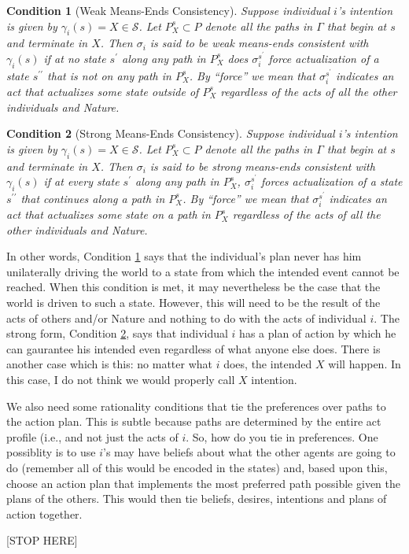 \documentclass[
11pt,
titlepage,
reqno,
]{article}%
\newtheorem{condition}{Condition}
\theoremstyle{definition}
\begin{document}
	\begin{condition}[Weak Means-Ends Consistency]\label{cond:weak M-E}
		Suppose individual $i$'s intention is given by $\gamma_i(s)=X\in\mathcal{S}$. 
		Let $P^s_X\subset P$ denote all the paths in $\Gamma$ that begin at $s$ and terminate in $X$. 
		Then $\sigma_i$ is said to be \textit{weak means-ends consistent with $\gamma_i(s)$} if at no state $s^\prime$ along any path in $P^s_X$ does $\sigma_i^{s^\prime}$ force actualization of a state $s^{\prime\prime}$ that is not on any path in $P^s_X$. 
		By ``force'' we mean that $\sigma_i^{s^\prime}$ indicates an act that actualizes some state outside of $P^s_X$ regardless of the acts of all the other individuals and Nature. 
	\end{condition}
	
	\begin{condition}[Strong Means-Ends Consistency]\label{cond:strong M-E}
		Suppose individual $i$'s intention is given by $\gamma_i(s)=X\in\mathcal{S}$. 
		Let $P^s_X\subset P$ denote all the paths in $\Gamma$ that begin at $s$ and terminate in $X$. 
		Then $\sigma_i$ is said to be \textit{strong means-ends consistent with $\gamma_i(s)$} if at every state $s^\prime$ along any path in $P^s_X$,  $\sigma_i^{s^\prime}$ forces actualization of a state $s^{\prime\prime}$ that continues along a path in $P^s_X$. 
		By ``force'' we mean that $\sigma_i^{s^\prime}$ indicates an act that actualizes some state on a path in $P^s_X$ regardless of the acts of all the other individuals and Nature. 
	\end{condition}
	
	In other words, Condition \ref{cond:weak M-E} says that the individual's plan never has him unilaterally driving the world to a state from which the intended event cannot be reached. 
	When this condition is met, it may nevertheless be the case that the world is driven to such a state. 
	However, this will need to be the result of the acts of others and/or Nature and nothing to do with the acts of individual $i$. 
	The strong form, Condition \ref{cond:strong M-E}, says that individual $i$ has a plan of action by which he can gaurantee his intended even regardless of what anyone else does.
	There is another case which is this: no matter what $i$ does, the intended $X$ will happen. 
	In this case, I do not think we would properly call $X$ intention. 
	
	We also need some rationality conditions that tie the preferences over paths to the action plan. 
	This is subtle because paths are determined by the entire act profile (i.e., and not just the acts of $i$. 
	So, how do you tie in preferences. One possiblity is to use $i$'s may have beliefs about what the other agents are going to do (remember all of this would be encoded in the states) and, based upon this, choose an action plan that implements the most preferred path possible given the plans of the others. 
	This would then tie beliefs, desires, intentions and plans of action together. 
	
	
	[STOP HERE]
	


\end{document}
